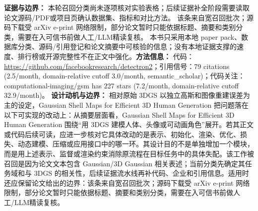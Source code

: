 \textbf{证据与边界：} 本轮召回分类尚未逐项核对实验表格；后续证据补全阶段需要读取论文源码/PDF或项目页确认数据集、指标和对比方法。 该条来自宽召回批次；源码下载受 arXiv e-print 网络限制，部分论文暂时只能依据标题、摘要和类别分类，需要在入可信书前做人工/LLM精读复核。 本书只采用本地 paper pack、数据库分类、源码/引用登记和论文摘要中可核验的信息；没有本地证据支撑的速度、排行榜或开源完整性不在正文中强化。\textbf{方法信息：} 代码：\url{https://github.com/facebookresearch/detectron2}；引用信号：79 citations (2.5/month, domain-relative cutoff 3.0/month, semantic\_scholar)；代码关注：computational-imaging/gsm has 227 stars (7.2/month, domain-relative cutoff 32.9/month)。
\textbf{设计动机与边界：} 相对原始 3DGS 以独立高斯和图像重建误差为主的设定，Gaussian Shell Maps for Efficient 3D Human Generation 把问题落在以下可实现的改动上：从摘要层面看，Gaussian Shell Maps for Efficient 3D Human Generation 围绕“用 3DGS 建模人体、头像或可动画角色”展开。若其正文或代码后续可读，应进一步核对它具体改动的是表示、初始化、渲染、优化、损失、动态建模、压缩或应用接口中的哪一环。其设计目的不是单独增加一个模块，而是用上述表示、监督或渲染约束消除原流程在目标任务中的具体失配。该工作被召回是因为论文文本包含 Gaussian/3D Gaussian 相关表述；当前分类先确定其任务域和与 3DGS 的相关性，后续证据流水线再补代码、企业和引用信息。适用时还应保留论文给出的边界：该条来自宽召回批次；源码下载受 arXiv e-print 网络限制，部分论文暂时只能依据标题、摘要和类别分类，需要在入可信书前做人工/LLM精读复核。
